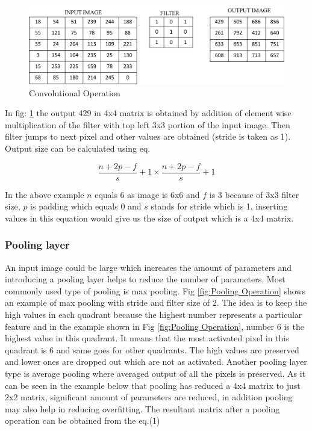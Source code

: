 \documentclass[11pt]{article}
\begin{document}
\begin{figure}[H]
	\centering
	\includegraphics[width=.6\linewidth]{files/cnn_architecture/conv.png}
	\caption{Convolutional Operation}
	\label{fig:Convolutional Operation}
\end{figure}

In fig: \ref{fig:Convolutional Operation} the output 429 in 4x4 matrix is obtained by addition of element wise multiplication of the filter with top left 3x3 portion of the input image. Then filter jumps to next pixel and other values are obtained (stride is taken as 1). Output size can be calculated using eq.

\begin{equation}
\frac{n+2p-f}{s}+1 \times \frac{n+2p-f}{s}+1
\end{equation}

In the above example $n$ equals 6 as image is 6x6 and $f$ is 3 because of 3x3 filter size, $p$ is padding which equals 0 and $s$ stands for stride which is 1, inserting values in this equation would give us the size of output which is a 4x4 matrix.

\subsubsection{Pooling layer}
An input image could be large which increases the amount of parameters and introducing a pooling layer helps to reduce the number of parameters. Most commonly used type of pooling is max pooling. Fig \ref{fig:Pooling Operation} shows an example of max pooling with stride and filter size of 2. The idea is to keep the high values in each quadrant because the highest number represents a particular feature and in the example shown in Fig \ref{fig:Pooling Operation}, number 6 is the highest value in this quadrant. It means that the most activated pixel in this quadrant is 6 and same goes for other quadrants. The high values are preserved and lower ones are dropped out which are not as activated. Another pooling layer type is average pooling where averaged output of all the pixels is preserved. As it can be seen in the example below that pooling has reduced a 4x4 matrix to just 2x2 matrix, significant amount of parameters are reduced, in addition pooling may also help in reducing overfitting. The resultant matrix after a pooling operation can be obtained from the eq.(1) 
\end{document}
